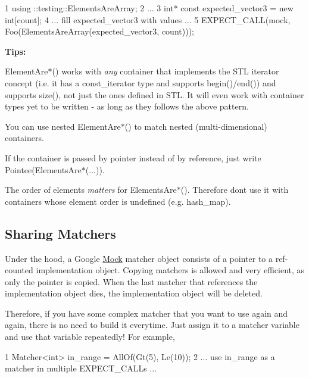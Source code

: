 \begin{DoxyCode}
1 using ::testing::ElementsAreArray;
2 ...
3   int* const expected\_vector3 = new int[count];
4   ... fill expected\_vector3 with values ...
5   EXPECT\_CALL(mock, Foo(ElementsAreArray(expected\_vector3, count)));
\end{DoxyCode}


{\bfseries Tips\+:}


\begin{DoxyItemize}
\item {\ttfamily Element\+Are$\ast$()} works with {\itshape any} container that implements the S\+TL iterator concept (i.\+e. it has a {\ttfamily const\+\_\+iterator} type and supports {\ttfamily begin()/end()}) and supports {\ttfamily size()}, not just the ones defined in S\+TL. It will even work with container types yet to be written -\/ as long as they follows the above pattern.
\item You can use nested {\ttfamily Element\+Are$\ast$()} to match nested (multi-\/dimensional) containers.
\item If the container is passed by pointer instead of by reference, just write {\ttfamily Pointee(Elements\+Are$\ast$(...))}.
\item The order of elements {\itshape matters} for {\ttfamily Elements\+Are$\ast$()}. Therefore don\textquotesingle{}t use it with containers whose element order is undefined (e.\+g. {\ttfamily hash\+\_\+map}).
\end{DoxyItemize}

\subsection*{Sharing Matchers}

Under the hood, a Google \hyperlink{class_mock}{Mock} matcher object consists of a pointer to a ref-\/counted implementation object. Copying matchers is allowed and very efficient, as only the pointer is copied. When the last matcher that references the implementation object dies, the implementation object will be deleted.

Therefore, if you have some complex matcher that you want to use again and again, there is no need to build it everytime. Just assign it to a matcher variable and use that variable repeatedly! For example,


\begin{DoxyCode}
1 Matcher<int> in\_range = AllOf(Gt(5), Le(10));
2 ... use in\_range as a matcher in multiple EXPECT\_CALLs ...
\end{DoxyCode}


